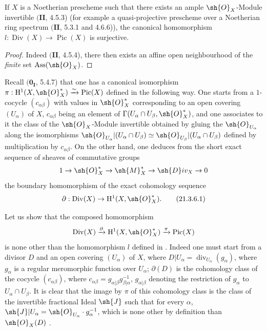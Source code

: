 \begin{corollary}[21.3.5]
\label{IV.21.3.5}
If $X$ is a Noetherian prescheme such that there exists an ample $\sh{O}_X$-Module invertible $(\mathbf{II}$, 4.5.3) (for example a quasi-projective prescheme over a Noetherian ring spectrum $(\mathbf{II}$, 5.3.1 and 4.6.6)), the canonical homomorphism $l:\operatorname{Div}(X)\to\operatorname{Pic}(X)$ is surjective.
\end{corollary}

\begin{proof}
Indeed $(\mathbf{II}$, 4.5.4), there then exists an affine open neighbourhood of the \emph{finite} set $\operatorname{Ass}(\sh{O}_X)$.
\end{proof}

\begin{remark}[21.3.6]
\label{IV.21.3.6}
Recall $(\mathbf{0_I}$, 5.4.7) that one has a canonical isomorphism $\pi:\mathrm{H}^1(X,\sh{O}_X^*)\xrightarrow{\sim}\operatorname{Pic}(X)$ defined in the following way.
One starts from a $1$-cocycle $(c_{\alpha\beta})$ with values in $\sh{O}_X^*$ corresponding to an open covering $(U_\alpha)$ of $X$, $c_{\alpha\beta}$ being an element of $\Gamma(U_\alpha\cap U_\beta,\sh{O}_X^*)$, and one associates to it the class of the $\sh{O}_X$-Module invertible obtained by gluing the $\sh{O}_{U_\alpha}$ along the isomorphisms $\sh{O}_{U_\alpha}|(U_\alpha\cap U_\beta)\simeq\sh{O}_{U_\beta}|(U_\alpha\cap U_\beta)$ defined by multiplication by $c_{\alpha\beta}$.
On the other hand, one deduces from the short exact sequence of sheaves of commutative groups
\[
  1\to\sh{O}_X^*\to\sh{M}_X^*\to\sh{D}iv_X\to 0
\]
the boundary homomorphism of the exact cohomology sequence
\[
\label{IV.21.3.6.1}
  \partial:\operatorname{Div}(X)\to\mathrm{H}^1(X,\sh{O}_X^*).
  \tag{21.3.6.1}
\]

Let us show that the composed homomorphism
\[
  \operatorname{Div}(X)\xrightarrow{\partial}\mathrm{H}^1(X,\sh{O}_X^*)\xrightarrow{\pi}\operatorname{Pic}(X)
\]
is none other than the homomorphism $l$ defined in .
Indeed one must start from a divisor $D$ and an open covering $(U_\alpha)$ of $X$, where $D|U_\alpha=\operatorname{div}_{U_\alpha}(g_\alpha)$, where $g_\alpha$ is a regular meromorphic function over $U_\alpha$;
$\partial(D)$ is the cohomology class of the cocycle $(c_{\alpha\beta})$, where $c_{\alpha\beta}=g_{\alpha|\beta}g_{\beta|\alpha}^{-1}$, $g_{\alpha|\beta}$ denoting the restriction of $g_\alpha$ to $U_\alpha\cap U_\beta$.
It is clear that the image by $\pi$ of this cohomology class is the class of the invertible fractional Ideal $\sh{J}$ such that for every $\alpha$, $\sh{J}|U_\alpha=\sh{O}_{U_\alpha}\cdot g_\alpha^{-1}$, which is none other by definition than $\sh{O}_X(D)$ .
\end{remark}

